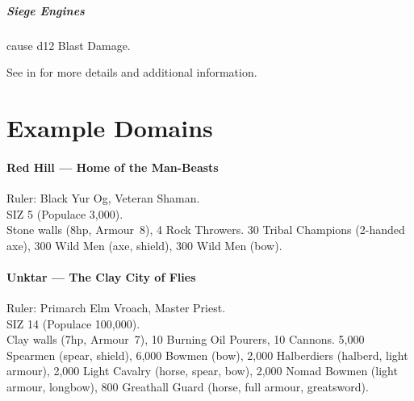 \documentclass[itdr]{subfiles}
\begin{document}
\subparagraph{Siege Engines} cause d12 Blast Damage.

\begin{dbox}
	See \textbf{} in \textbf{} for more details and additional information.
\end{dbox}

\vfill

\section{Example Domains}

\paragraph{Red Hill --- Home of the Man-Beasts}
Ruler: Black Yur Og, Veteran Shaman.\\
SIZ 5 (Populace 3,000).\\
Stone walls (8hp, Armour~8), 4 Rock Throwers. 30 Tribal Champions (2-handed axe), 300 Wild Men (axe, shield), 300 Wild Men (bow).

\paragraph{Unktar --- The Clay City of Flies}
Ruler: Primarch Elm Vroach, Master Priest.\\
SIZ 14 (Populace 100,000).\\
Clay walls (7hp, Armour~7), 10 Burning Oil Pourers, 10 Cannons. 5,000 Spearmen (spear, shield), 6,000 Bowmen (bow), 2,000 Halberdiers (halberd, light armour), 2,000 Light Cavalry (horse, spear, bow), 2,000 Nomad Bowmen (light armour, longbow), 800 Greathall Guard (horse, full armour, greatsword).

\vfill
\end{document}
